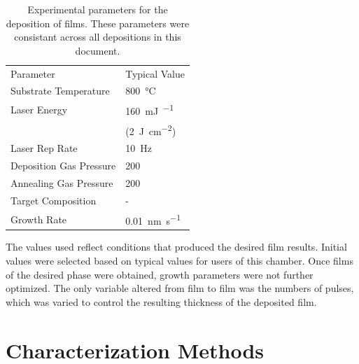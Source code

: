 \begin{table} \small
\begin{center}
	\begin{tabular}{ll}

		Parameter &  
		Typical Value   \\
		
		\cmidrule(lr){1-1}
		\cmidrule(lr){2-2}
		
   		Substrate Temperature & 
		800~\si{\degreeCelsius} \\
		
  		Laser Energy & 
		160~\si{\milli\joule\per\pulse}  \\
		
		&
		(2~\si{\joule\per\centi\meter\squared}) \\
		
		Laser Rep Rate & 
		10~\si{\hertz} \\
		
		Deposition Gas Pressure & 
		200~\si{\milli\torr} \\
		
		Annealing Gas Pressure & 
		200~\si{\torr} \\
		
		Target Composition & 
		\textalpha-\ce{Fe2O3} \\
		
		Growth Rate & 
		0.01~\si{\nano\meter\per\second} \\

	\end{tabular}
	\end{center}
  	\caption[Experimental parameters for  film deposition]{%
		Experimental parameters for the deposition of  films. 
		These parameters were consistant across all depositions in this 
		document.}
	\label{tab:pldparameters}
\end{table}

The values used reflect conditions that produced the desired film results. Initial values
were selected based on typical values for users of this  chamber. Once films of
the desired phase were obtained, growth parameters were not further optimized. The only
variable altered from film to film was the numbers of pulses, which was varied to control
the resulting thickness of the deposited film.


\section{Characterization Methods}
\label{sec:exp.characterization}


